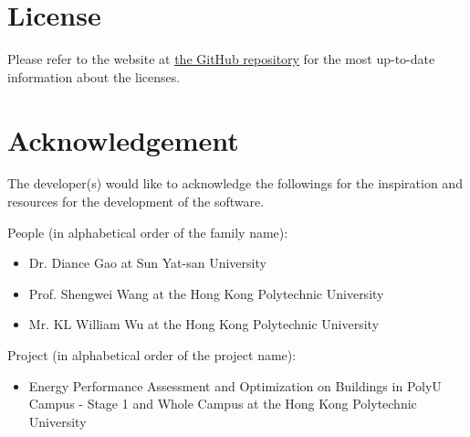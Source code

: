 \documentclass[12pt,a4paper]{article}
\begin{document}
\section{License}

Please refer to the website at \href{https://github.com/howardcheung/data-preprocessing-helper/}{the GitHub repository} for the most up-to-date information about the licenses.

\section{Acknowledgement}

The developer(s) would like to acknowledge the followings for the inspiration and resources for the development of the software.

People (in alphabetical order of the family name):
\begin{itemize}
\item Dr. Diance Gao at Sun Yat-san University
\item Prof. Shengwei Wang at the Hong Kong Polytechnic University
\item Mr. KL William Wu at the Hong Kong Polytechnic University
\end{itemize}

Project (in alphabetical order of the project name):
\begin{itemize}
\item Energy Performance Assessment and Optimization on Buildings in PolyU Campus - Stage 1 and Whole Campus at the Hong Kong Polytechnic University
\end{itemize}
\end{document}
